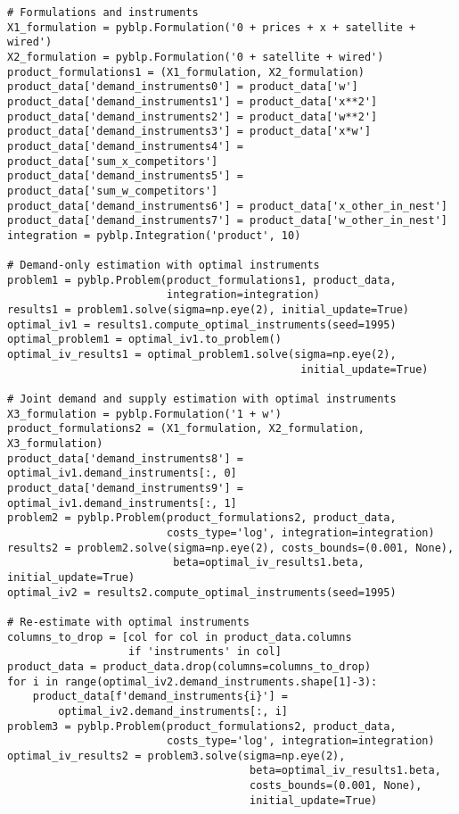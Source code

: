 \documentclass[english,11pt]{article}
\begin{document}
\begin{enumerate}
\begin{enumerate}
\begin{verbatim}
# Formulations and instruments
X1_formulation = pyblp.Formulation('0 + prices + x + satellite + wired')
X2_formulation = pyblp.Formulation('0 + satellite + wired')
product_formulations1 = (X1_formulation, X2_formulation)
product_data['demand_instruments0'] = product_data['w']
product_data['demand_instruments1'] = product_data['x**2']
product_data['demand_instruments2'] = product_data['w**2']
product_data['demand_instruments3'] = product_data['x*w']
product_data['demand_instruments4'] = product_data['sum_x_competitors']
product_data['demand_instruments5'] = product_data['sum_w_competitors']
product_data['demand_instruments6'] = product_data['x_other_in_nest']
product_data['demand_instruments7'] = product_data['w_other_in_nest']
integration = pyblp.Integration('product', 10)

# Demand-only estimation with optimal instruments
problem1 = pyblp.Problem(product_formulations1, product_data, 
                         integration=integration)
results1 = problem1.solve(sigma=np.eye(2), initial_update=True)
optimal_iv1 = results1.compute_optimal_instruments(seed=1995)
optimal_problem1 = optimal_iv1.to_problem()
optimal_iv_results1 = optimal_problem1.solve(sigma=np.eye(2), 
                                              initial_update=True)

# Joint demand and supply estimation with optimal instruments
X3_formulation = pyblp.Formulation('1 + w')
product_formulations2 = (X1_formulation, X2_formulation, X3_formulation)
product_data['demand_instruments8'] = optimal_iv1.demand_instruments[:, 0]
product_data['demand_instruments9'] = optimal_iv1.demand_instruments[:, 1]
problem2 = pyblp.Problem(product_formulations2, product_data, 
                         costs_type='log', integration=integration)
results2 = problem2.solve(sigma=np.eye(2), costs_bounds=(0.001, None), 
                          beta=optimal_iv_results1.beta, initial_update=True)
optimal_iv2 = results2.compute_optimal_instruments(seed=1995)

# Re-estimate with optimal instruments
columns_to_drop = [col for col in product_data.columns 
                   if 'instruments' in col]
product_data = product_data.drop(columns=columns_to_drop)
for i in range(optimal_iv2.demand_instruments.shape[1]-3):
    product_data[f'demand_instruments{i}'] = 
        optimal_iv2.demand_instruments[:, i]
problem3 = pyblp.Problem(product_formulations2, product_data, 
                         costs_type='log', integration=integration)
optimal_iv_results2 = problem3.solve(sigma=np.eye(2), 
                                      beta=optimal_iv_results1.beta, 
                                      costs_bounds=(0.001, None), 
                                      initial_update=True)
\end{verbatim}


\end{enumerate}
\end{enumerate}
\end{document}
